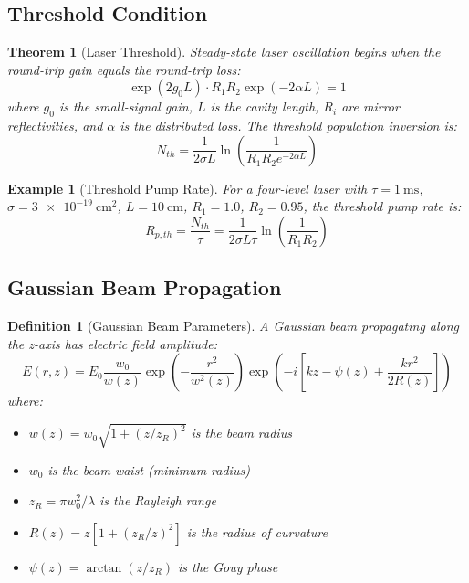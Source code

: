 \documentclass[a4paper, 11pt]{article}
\newtheorem{definition}{Definition}[section]
\newtheorem{theorem}{Theorem}[section]
\newtheorem{example}{Example}[section]
\begin{document}
\subsection{Threshold Condition}

\begin{theorem}[Laser Threshold]
Steady-state laser oscillation begins when the round-trip gain equals the round-trip loss:
\begin{equation}
\exp(2g_0 L) \cdot R_1 R_2 \exp(-2\alpha L) = 1
\end{equation}
where $g_0$ is the small-signal gain, $L$ is the cavity length, $R_i$ are mirror reflectivities,
and $\alpha$ is the distributed loss. The threshold population inversion is:
\begin{equation}
N_{th} = \frac{1}{2\sigma L} \ln\left(\frac{1}{R_1 R_2 e^{-2\alpha L}}\right)
\end{equation}
\end{theorem}

\begin{example}[Threshold Pump Rate]
For a four-level laser with $\tau = \SI{1}{\milli\second}$, $\sigma = \SI{3e-19}{\centi\meter\squared}$,
$L = \SI{10}{\centi\meter}$, $R_1 = 1.0$, $R_2 = 0.95$, the threshold pump rate is:
\begin{equation}
R_{p,th} = \frac{N_{th}}{\tau} = \frac{1}{2\sigma L \tau} \ln\left(\frac{1}{R_1 R_2}\right)
\end{equation}
\end{example}

\subsection{Gaussian Beam Propagation}

\begin{definition}[Gaussian Beam Parameters]
A Gaussian beam propagating along the z-axis has electric field amplitude:
\begin{equation}
E(r, z) = E_0 \frac{w_0}{w(z)} \exp\left(-\frac{r^2}{w^2(z)}\right)
\exp\left(-i\left[kz - \psi(z) + \frac{kr^2}{2R(z)}\right]\right)
\end{equation}
where:
\begin{itemize}
\item $w(z) = w_0 \sqrt{1 + (z/z_R)^2}$ is the beam radius
\item $w_0$ is the beam waist (minimum radius)
\item $z_R = \pi w_0^2 / \lambda$ is the Rayleigh range
\item $R(z) = z[1 + (z_R/z)^2]$ is the radius of curvature
\item $\psi(z) = \arctan(z/z_R)$ is the Gouy phase
\end{itemize}
\end{definition}
\end{document}
